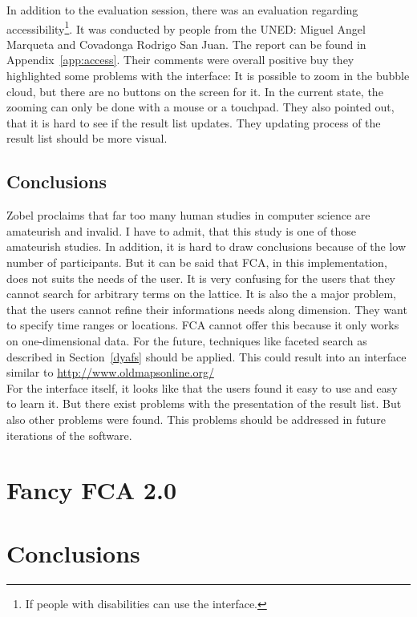 \documentclass[11pt]{report}
\begin{document}
In addition to the evaluation session, there was an evaluation regarding accessibility\footnote{If people with disabilities can use the interface.}. It was conducted by people from the UNED: Miguel Angel Marqueta and Covadonga Rodrigo San Juan. The report can be found in Appendix~\ref{app:access}. Their comments were overall positive buy they highlighted some problems with the interface: It is possible to zoom in the bubble cloud, but there are no buttons on the screen for it. In the current state, the zooming can only be done with a mouse or a touchpad. They also pointed out, that it is hard to see if the result list updates. They updating process of the result list should be more visual.

\section{Conclusions} 
Zobel\cite{Zobel2004} proclaims that far too many human studies in computer science are amateurish and invalid. I have to admit, that this study is one of those amateurish studies. In addition, it is hard to draw conclusions because of the low number of participants. But it can be said that FCA, in this implementation, does not suits the needs of the user. It is very confusing for the users that they cannot search for arbitrary terms on the lattice. It is also the a major problem, that the users cannot refine their informations needs along dimension. They want to specify time ranges or locations. FCA cannot offer this because it only works on one-dimensional data. For the future, techniques like faceted search as described in Section~\ref{dyafs} should be applied. This could result into an interface similar to \url{http://www.oldmapsonline.org/}\\
 
For the interface itself, it looks like that the users found it easy to use and easy to learn it. But there exist problems with the presentation of the result list. But also other problems were found. This problems should be addressed in future iterations of the software.
\chapter{Fancy FCA 2.0}
\label{Fancy 2.0}

\blindtext

\chapter{Conclusions}
\label{Conclusions}
\end{document}
